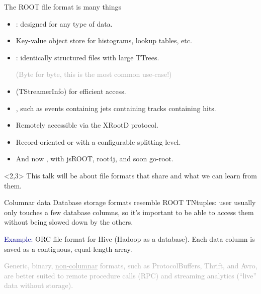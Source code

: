 \documentclass{beamer}
\begin{document}
\begin{frame}{The ROOT file format is many things}
\begin{itemize}\setlength{\itemsep}{0.2 cm}
\item {}: designed for any type of data.

\item Key-value object store for histograms, lookup tables, etc.

\item {}: identically structured files with large TTrees.

\textcolor{darkgray}{(Byte for byte, this is the most common use-case!)}

\item {} (TStreamerInfo) for efficient access.

\item {}, such as events containing jets containing tracks containing hits.

\item Remotely accessible via the XRootD protocol.

\item Record-oriented or  with a configurable splitting level.

\item And now , with jsROOT, root4j, and soon go-root.
\end{itemize}

\begin{uncoverenv}<2,3>
\vspace{0.3 cm}
This talk will be about file formats that share  and what we can learn from them. 
\end{uncoverenv}
\end{frame}

\begin{frame}{Columnar data}
\vspace{0.5 cm}
Database storage formats resemble ROOT TNtuples: user usually only touches a few database columns, so it's important to be able to access them without being slowed down by the others.

\vspace{0.3 cm}
\textcolor{darkblue}{Example:} ORC file format for Hive (Hadoop as a database). Each data column is saved as a contiguous, equal-length array.

\vspace{0.75 cm}
\textcolor{darkgray}{Generic, binary, \underline{non-columnar} formats, such as ProtocolBuffers, Thrift, and Avro, are better suited to remote procedure calls (RPC) and streaming analytics (``live'' data without storage).}
\end{frame}
\end{document}
